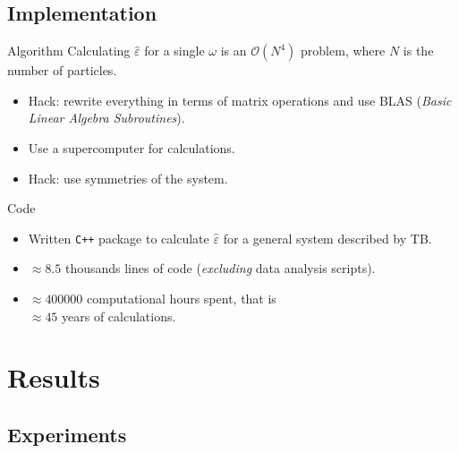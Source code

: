 \documentclass{beamer}
\begin{document}
\subsection{Implementation}

\begin{frame}{Algorithm}
    Calculating $\hat\varepsilon$ for a single $\omega$ is an \alert{$\mathcal{O}(N^4)$ problem}, where $N$ is the number of particles.
    \begin{itemize}
    \item Hack: rewrite everything in terms of \alert{matrix operations} and use BLAS (\emph{Basic Linear Algebra Subroutines}).
    \item Use a \alert{supercomputer} for calculations.
    \item Hack: use \alert{symmetries} of the system.
    \end{itemize}
\end{frame}


\begin{frame}{Code}
    \begin{itemize}
    \item Written \texttt{C++} package to calculate $\hat\varepsilon$ for a \alert{general} system described by TB.
    \item \alert{$\approx 8.5$ thousands} lines of code (\emph{excluding} data analysis scripts).
    \item $\approx 400000$ computational hours spent, that is \\ \alert{$\approx 45$ years of calculations}.
    \end{itemize}
\end{frame}

\section{Results}

\subsection{Experiments}
\end{document}
